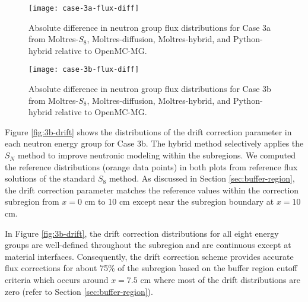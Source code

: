%

\begin{figure}[p]
  \centering
  \texttt{[image: case-3a-flux-diff]}
  \caption{Absolute difference in neutron group flux distributions for Case 3a from Moltres-$S_8$,
  Moltres-diffusion, Moltres-hybrid, and Python-hybrid relative to OpenMC-MG.}
  \label{fig:3a-flux-diff}
\end{figure}

\begin{figure}[p]
  \centering
  \texttt{[image: case-3b-flux-diff]}
  \caption{Absolute difference in neutron group flux distributions for Case 3b from Moltres-$S_8$,
  Moltres-diffusion, Moltres-hybrid, and Python-hybrid relative to OpenMC-MG.}
  \label{fig:3b-flux-diff}
\end{figure}

\FloatBarrier


Figure \ref{fig:3b-drift} shows the distributions of the drift correction parameter in each neutron
energy group for Case 3b. The hybrid method selectively applies the $S_N$ method to improve
neutronic modeling within the subregions. We computed
the reference distributions (orange data points) in both plots from reference flux solutions of the
standard $S_8$ method.
As discussed in Section \ref{sec:buffer-region}, the drift correction parameter matches the
reference values within the correction subregion
from $x=0$ cm to 10 cm except near the subregion boundary at $x=10$ cm.

In Figure \ref{fig:3b-drift}, the drift
correction distributions for all eight energy groups are well-defined throughout
the subregion and are continuous except at material interfaces. Consequently, the drift correction
scheme provides accurate flux corrections for about 75\% of the subregion based on the buffer
region cutoff criteria which occurs around $x=7.5$ cm where most of the drift distributions are
zero (refer to Section \ref{sec:buffer-region}).

